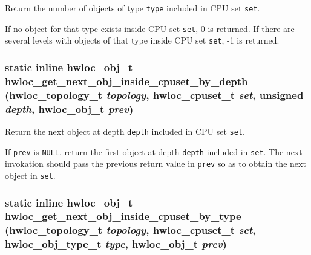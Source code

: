 Return the number of objects of type {\tt type} included in CPU set {\tt set}. 

If no object for that type exists inside CPU set {\tt set}, 0 is returned. If there are several levels with objects of that type inside CPU set {\tt set}, -1 is returned. \hypertarget{group__hwlocality__helper__find__inside_g9f0cdb50962d59220a557757278e1919}{
\subsubsection[{hwloc\_\-get\_\-next\_\-obj\_\-inside\_\-cpuset\_\-by\_\-depth}]{\setlength{\rightskip}{0pt plus 5cm}static inline {\bf hwloc\_\-obj\_\-t} hwloc\_\-get\_\-next\_\-obj\_\-inside\_\-cpuset\_\-by\_\-depth ({\bf hwloc\_\-topology\_\-t} {\em topology}, \/  {\bf hwloc\_\-cpuset\_\-t} {\em set}, \/  unsigned {\em depth}, \/  {\bf hwloc\_\-obj\_\-t} {\em prev})}}
\label{group__hwlocality__helper__find__inside_g9f0cdb50962d59220a557757278e1919}


Return the next object at depth {\tt depth} included in CPU set {\tt set}. 

If {\tt prev} is {\tt NULL}, return the first object at depth {\tt depth} included in {\tt set}. The next invokation should pass the previous return value in {\tt prev} so as to obtain the next object in {\tt set}. \hypertarget{group__hwlocality__helper__find__inside_g060d4f60652ef68bc25bf83e5db1fdb9}{
\subsubsection[{hwloc\_\-get\_\-next\_\-obj\_\-inside\_\-cpuset\_\-by\_\-type}]{\setlength{\rightskip}{0pt plus 5cm}static inline {\bf hwloc\_\-obj\_\-t} hwloc\_\-get\_\-next\_\-obj\_\-inside\_\-cpuset\_\-by\_\-type ({\bf hwloc\_\-topology\_\-t} {\em topology}, \/  {\bf hwloc\_\-cpuset\_\-t} {\em set}, \/  {\bf hwloc\_\-obj\_\-type\_\-t} {\em type}, \/  {\bf hwloc\_\-obj\_\-t} {\em prev})}}
\label{group__hwlocality__helper__find__inside_g060d4f60652ef68bc25bf83e5db1fdb9}


